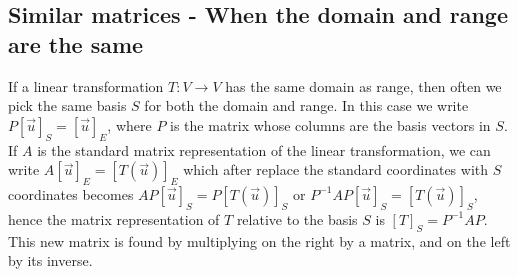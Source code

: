 \documentclass[10pt]{article}
\theoremstyle{plain}
\theoremstyle{box}
\begin{document}


\subsection{Similar matrices - When the domain and range are the same}
If a linear transformation $T:V\to V$ has the same domain as range, then often we pick the same basis $S$ for both the domain and range. In this case we write $P[\vec u]_S = [\vec u]_E$, where $P$ is the matrix whose columns are the basis vectors in $S$. If $A$ is the standard matrix representation of the linear transformation, we can write $A[\vec u]_E = [T(\vec u)]_E$ which after replace the standard coordinates with $S$ coordinates becomes $AP[\vec u]_S = P[T(\vec u)]_S$ or $P^{-1}AP [\vec u]_S = [T(\vec u)]_S$, hence the matrix representation of $T$ relative to the basis $S$ is $[T]_S = P^{-1}AP$. This new matrix is found by multiplying on the right by a matrix, and on the left by its inverse.    
\end{document}
